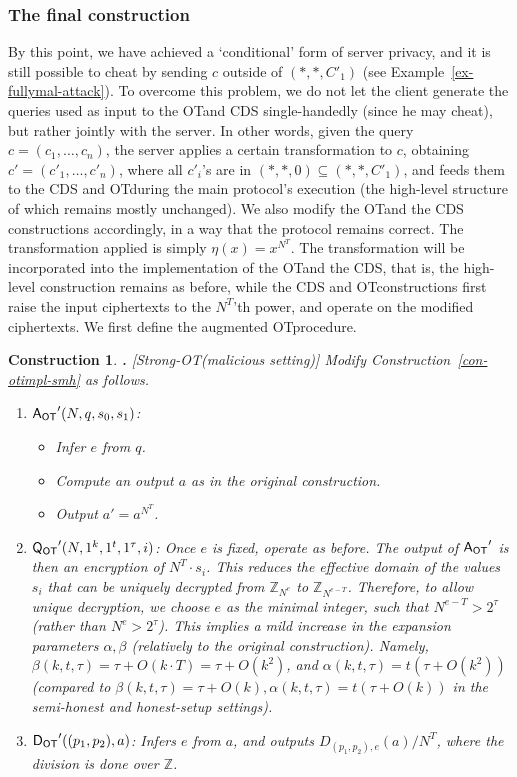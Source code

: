 \documentclass{article}
\newcommand{\queot}{{\sf Q_{OT}}}
\newcommand{\ansot}{{\sf A_{OT}}}
\newcommand{\decot}{{\sf D_{OT}}}
\newcommand{\otl}{{\tau}}
\newcommand{\decdj}{{D}_{(p_1,p_2),e}}
\newcommand{\Z}{{\mathbb{Z}}}
\newtheorem{CONSTRUCTION}{Construction}[section]
\newenvironment{construction}{\begin{CONSTRUCTION} \hspace{-.85em} {\bf .} \rm}%
	{\end{CONSTRUCTION}}
\newcommand{\ot}{\mbox{OT}\;}
\newcommand{\strongot}{{Strong-OT\;}}
\begin{document}
\subsubsection{The final construction}
\label{subsec-mal-uncond}
By this point, we have achieved a `conditional' form of server privacy, and it is still possible
to cheat by sending $c$ outside of $(*,*,C'_1)$ (see Example~\ref{ex-fullymal-attack}).
To overcome this problem, we do not let the client
generate the queries used as input to the \ot and CDS single-handedly (since he may cheat), but rather
jointly with the server. In other words, given the query $c=(c_1,\ldots,c_n)$, the server applies a certain transformation to $c$, obtaining $c'=(c'_1,\ldots,c'_n)$, where all $c'_i$'s are in $(*,*,0)\subseteq{(*,*,C'_1)}$, and feeds them to the CDS and \ot during the main protocol's execution (the high-level structure of which remains mostly unchanged). We also modify the \ot and the CDS constructions accordingly, in a way that the protocol remains correct.
The transformation applied is simply $\eta(x)=x^{N^T}$. The transformation will be incorporated into the implementation of the \ot and the CDS, that is, the high-level construction remains as before, while the CDS and \ot constructions first raise the input ciphertexts to the $N^T$'th power, and operate on the modified ciphertexts. We first define the augmented \ot procedure.
\begin{construction}[\strongot (malicious setting)]
  \label{con-otimpl-mal}
  Modify Construction~\ref{con-otimpl-smh} as follows.
  \begin{enumerate}
    \item $\ansot'(N,q,s_0,s_1)$:
    \begin{itemize}
      \item Infer $e$ from $q$.
      \item Compute an output $a$ as in the original construction.
      \item Output $a'=a^{N^T}$.
    \end{itemize}
    \item $\queot'(N,1^k,1^t,1^{\otl},i)$:
    Once $e$ is fixed, operate as before.
    The output of $\ansot'$ is then an encryption of $N^T\cdot s_i$.
    This reduces the effective domain of the values $s_i$ that can be uniquely decrypted from $\Z_{N^e}$
    to $\Z_{N^{e-T}}$. Therefore, to allow unique decryption, we choose $e$ as the minimal integer,
    such that $N^{e-T}>2^{\otl}$ (rather than $N^e>2^{\otl}$). This implies a mild increase in the expansion
    parameters $\alpha,\beta$ (relatively to the original construction). Namely, $\beta(k,t,\otl)=\otl+O(k\cdot T)=\otl+O(k^2)$, and $\alpha(k,t,\otl)=t(\otl+O(k^2))$ (compared to $\beta(k,t,\otl)=\otl+O(k),\alpha(k,t,\otl)=t(\otl+O(k))$ in the semi-honest
    and honest-setup settings).
    \item $\decot'((p_1,p_2),a)$: Infers $e$ from $a$, and outputs $\decdj(a)/N^T$, where the division is done over
    $\Z$.
  \end{enumerate}
\end{construction}
\end{document}
